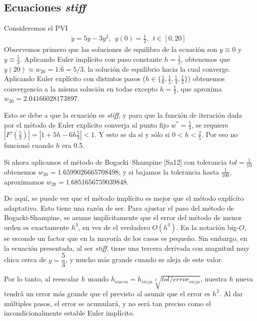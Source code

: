 \documentclass[spanish]{article}
\begin{document}
\noindent
\subsection{Ecuaciones \textit{stiff}}
Consideremos el PVI
\begin{align*}
\dot{y} = 5y-3y^2, \ \ y(0) = \frac{1}{2}, \ \ t \in [0,20]
\end{align*}
Observemos primero que las soluciones de equilibro de la ecuación son $y \equiv 0$ y 
$y \equiv \frac{5}{3}$.
Aplicando Euler implícito con paso constante $h = \frac{1}{2}$, obtenemos que
$y(20) \approx w_{20} = 1.\bar{6} = 5/3$, la solución de equilibrio hacia
la cual converge.
Aplicando Euler explícito con distintos pasos ($h \in \{\frac{1}{6}, \frac{1}{5}, 
\frac{1}{4}, \frac{1}{2} \}$) obtenemos convergencia a la misma solución en todas
excepto $h = \frac{1}{2}$, que aproxima $w_{20} = 2.04166028173897$.

Esto se debe a que la ecuación es \textit{stiff}, y para que la función de iteración
dada por el método de Euler explícito converja al punto fijo $w^* = \frac{5}{3}$, se
requiere $|F'(\frac{5}{3})| = |1+5h-6h\frac{5}{3}|<1$. Y esto se da si y sólo si 
$0 < h < \frac{2}{5}$. Por eso no funcionó cuando $h$ era 0.5.

Si ahora aplicamos el método de Bogacki–Shampine [Sa12]  con tolerancia $tol = 
\frac{1}{10}$  obtenemos $w_{20} = 1.6599026665708498$; y si bajamos la tolerancia 
hasta  $\frac{1}{100}$, aproximamos $w_{20} = 1.6851656759039848$.

De aquí, se puede ver que el método implícito es mejor que el método explícito 
adaptativo. Esto tiene una razón de ser. Para ajustar el paso del método de 
Bogacki-Shampine, se asume implícitamente que el error del método de menor orden 
es exactamente $h^3$, en vez de el verdadero $O(h^3)$. En la notación big-$O$, se 
esconde un factor que en la mayoría de los casos es pequeño. Sin embargo, en la 
ecuación presentada, al ser \textit{stiff}, tiene una tercera derivada con magnitud 
muy chica cerca de $y=\dfrac{5}{3}$, y mucho más grande cuando se aleja de este valor.

Por lo tanto, al reescalar $h$ usando $h_{nueva}=h_{vieja}\sqrt[3]{tol/error_{viejo}}$, 
nuestra $h$ nueva tendrá un error más grande que el previsto al asumir que el error es
$h^3$. Al dar múltiples pasos, el error se acumulará, y no será tan preciso como el 
incondicionalmente estable Euler implícito.
\end{document}
